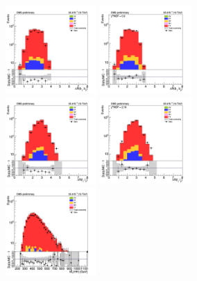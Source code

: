
\begin{figure}[tbp]
  \begin{center}
    \includegraphics[width=0.31\textwidth]{figures/ee_300_april18/dR_bjets_ee_CRTT_prefit_plot_apr18.png}
    \includegraphics[width=0.31\textwidth]{figures/ee_300_april18/dR_bjets_ee_CRTT_FullPostfit_plot_apr18.png}\\
    \includegraphics[width=0.31\textwidth]{figures/ee_300_april18/dR_leps_ee_CRTT_prefit_plot_apr18.png}
    \includegraphics[width=0.31\textwidth]{figures/ee_300_april18/dR_leps_ee_CRTT_FullPostfit_plot_apr18.png}\\
    \includegraphics[width=0.31\textwidth]{figures/ee_300_april18/hhMt_ee_CRTT_prefit_plot_apr18.png}

\end{center}
\end{figure}
